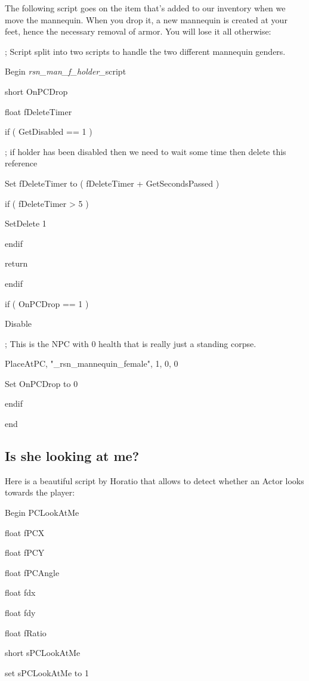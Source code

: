 \documentclass[
]{article}
\begin{document}
The following script goes on the item that's added to our inventory when
we move the mannequin. When you drop it, a new mannequin is created at
your feet, hence the necessary removal of armor. You will lose it all
otherwise:

; Script split into two scripts to handle the two different mannequin
genders.

Begin \emph{rsn\_man\_f\_holder\_}script

short OnPCDrop

float fDeleteTimer

if ( GetDisabled == 1 )

; if holder has been disabled then we need to wait some time then delete
this reference

Set fDeleteTimer to ( fDeleteTimer + GetSecondsPassed )

if ( fDeleteTimer \textgreater{} 5 )

SetDelete 1

endif

return

endif

if ( OnPCDrop == 1 )

Disable

; This is the NPC with 0 health that is really just a standing corpse.

PlaceAtPC, "\_rsn\_mannequin\_female", 1, 0, 0

Set OnPCDrop to 0

endif

end

\hypertarget{is-she-looking-at-me}{%
\subsection{\texorpdfstring{\hfill\break
Is she looking at
me?}{ Is she looking at me?}}\label{is-she-looking-at-me}}

Here is a beautiful script by Horatio that allows to detect whether an
Actor looks towards the player:

Begin PCLookAtMe

float fPCX

float fPCY

float fPCAngle

float fdx

float fdy

float fRatio

short sPCLookAtMe

set sPCLookAtMe to 1
\end{document}
